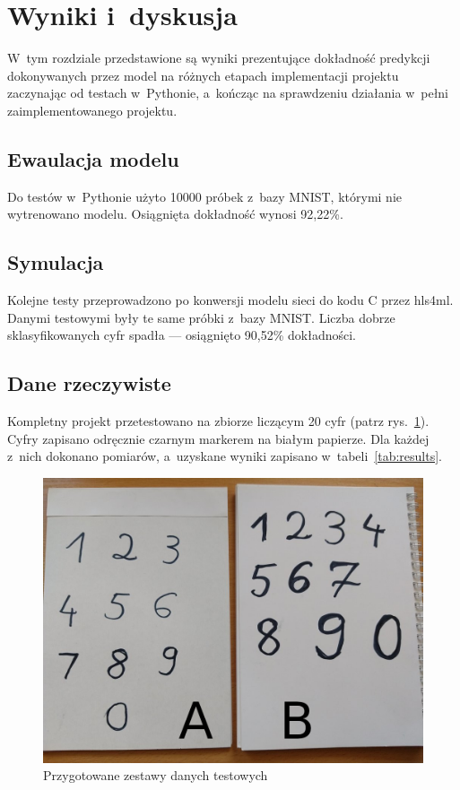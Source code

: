 \documentclass[12pt, oneside, a4paper]{article}
\def\CPP{{C\nolinebreak[4]\hspace{-.05em}\raisebox{.4ex}{\tiny\bf ++}}}
\begin{document}
\newpage
\section{Wyniki i~dyskusja}\label{sec:Wyniki i~dyskusja}
W~tym rozdziale przedstawione są wyniki prezentujące dokładność
predykcji dokonywanych przez model na różnych etapach implementacji
projektu zaczynając od testach w~Pythonie, a~kończąc na sprawdzeniu
działania w~pełni zaimplementowanego projektu.

\subsection{Ewaulacja modelu}\label{sec:Ewaulacja modelu}
Do testów w~Pythonie użyto 10000 próbek z~bazy MNIST, którymi nie
wytrenowano modelu. Osiągnięta dokładność wynosi 92,22\%. 

\subsection{Symulacja}\label{sec:Symulacja}
Kolejne testy przeprowadzono po konwersji modelu sieci do kodu \CPP{}
przez hls4ml. Danymi testowymi były te same próbki z~bazy MNIST.
Liczba dobrze sklasyfikowanych cyfr spadła --- osiągnięto 90,52\%
dokładności.

\subsection{Dane rzeczywiste}\label{sec:Dane rzeczywiste}
Kompletny projekt przetestowano na zbiorze liczącym 20 cyfr (patrz
rys.~\ref{fig:test_data}). Cyfry
zapisano odręcznie czarnym markerem na białym papierze. Dla każdej z~nich
dokonano pomiarów, a~uzyskane wyniki zapisano w~tabeli~\ref{tab:results}.

\begin{figure}[h]
  \centering
  \includegraphics[width=0.9\linewidth]{figures/test_data.jpg}
  \caption{Przygotowane zestawy danych testowych}\label{fig:test_data}
\end{figure}
\end{document}
